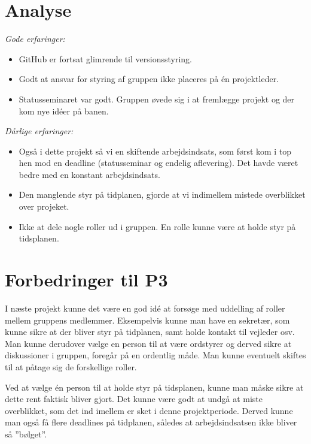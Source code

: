 \section{Analyse}

\emph{Gode erfaringer:}
\begin {itemize}
\item  GitHub er fortsat glimrende til versionsstyring.

\item	Godt at ansvar for styring af gruppen ikke placeres på én projektleder. 

\item	Statusseminaret var godt. Gruppen øvede sig i at fremlægge projekt og der kom nye idéer på banen.
\end{itemize}\emph{Dårlige erfaringer:}
\begin{itemize}
\item	Også i dette projekt så vi en skiftende arbejdsindsats, som først kom i top hen mod en deadline (statusseminar og endelig aflevering). Det havde været bedre med en konstant arbejdsindsats. 

\item	Den manglende styr på tidplanen, gjorde at vi indimellem mistede overblikket over projeket. 

\item	Ikke at dele nogle roller ud i gruppen. En rolle kunne være at holde styr på tidsplanen.
\end{itemize}

\section{Forbedringer til P3}

I næste projekt kunne det være en god idé at forsøge med uddelling af roller mellem gruppens medlemmer. Eksempelvis kunne man have en sekretær, som kunne sikre at der bliver styr på tidplanen, samt holde kontakt til vejleder osv. Man kunne derudover vælge en person til at være ordstyrer og derved sikre at diskussioner i gruppen, foregår på en ordentlig måde. Man kunne eventuelt skiftes til at påtage sig de forskellige roller. 

Ved at vælge én person til at holde styr på tidsplanen, kunne man måske sikre at dette rent faktisk bliver gjort. Det kunne være godt at undgå at miste overblikket, som det ind imellem er sket i denne projektperiode. Derved kunne man også få flere deadlines på tidplanen, således at arbejdsindsatsen ikke bliver så ”bølget”.


